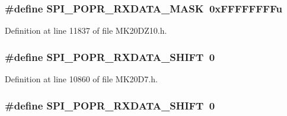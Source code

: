 \subsubsection[{\texorpdfstring{S\+P\+I\+\_\+\+P\+O\+P\+R\+\_\+\+R\+X\+D\+A\+T\+A\+\_\+\+M\+A\+SK}{SPI_POPR_RXDATA_MASK}}]{\setlength{\rightskip}{0pt plus 5cm}\#define S\+P\+I\+\_\+\+P\+O\+P\+R\+\_\+\+R\+X\+D\+A\+T\+A\+\_\+\+M\+A\+SK~0x\+F\+F\+F\+F\+F\+F\+F\+Fu}\hypertarget{group___s_p_i___register___masks_ga3d2d3998529fd7de17cac99d625fe004}{}\label{group___s_p_i___register___masks_ga3d2d3998529fd7de17cac99d625fe004}


Definition at line 11837 of file M\+K20\+D\+Z10.\+h.

\subsubsection[{\texorpdfstring{S\+P\+I\+\_\+\+P\+O\+P\+R\+\_\+\+R\+X\+D\+A\+T\+A\+\_\+\+S\+H\+I\+FT}{SPI_POPR_RXDATA_SHIFT}}]{\setlength{\rightskip}{0pt plus 5cm}\#define S\+P\+I\+\_\+\+P\+O\+P\+R\+\_\+\+R\+X\+D\+A\+T\+A\+\_\+\+S\+H\+I\+FT~0}\hypertarget{group___s_p_i___register___masks_ga862819a722e0ccbd3f03edce9b82e5c2}{}\label{group___s_p_i___register___masks_ga862819a722e0ccbd3f03edce9b82e5c2}


Definition at line 10860 of file M\+K20\+D7.\+h.

\subsubsection[{\texorpdfstring{S\+P\+I\+\_\+\+P\+O\+P\+R\+\_\+\+R\+X\+D\+A\+T\+A\+\_\+\+S\+H\+I\+FT}{SPI_POPR_RXDATA_SHIFT}}]{\setlength{\rightskip}{0pt plus 5cm}\#define S\+P\+I\+\_\+\+P\+O\+P\+R\+\_\+\+R\+X\+D\+A\+T\+A\+\_\+\+S\+H\+I\+FT~0}\hypertarget{group___s_p_i___register___masks_ga862819a722e0ccbd3f03edce9b82e5c2}{}\label{group___s_p_i___register___masks_ga862819a722e0ccbd3f03edce9b82e5c2}


